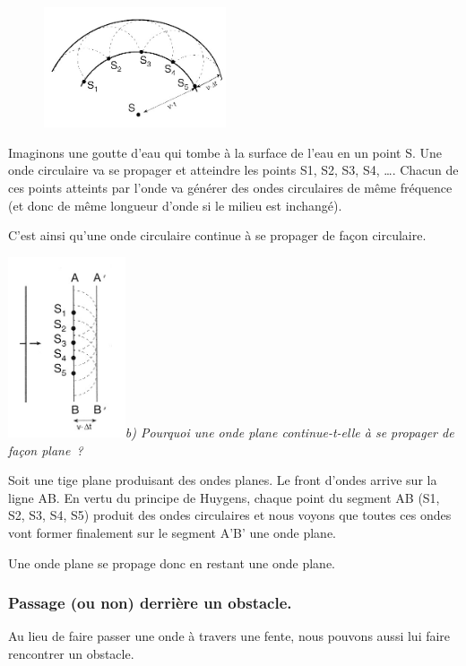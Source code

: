 \begin{figure}
\centering
\includegraphics[width=5.369cm,height=3.551cm]{Pictures/10000001000001E8000001439B3D312A195F0A9A.png}
\caption{}
\end{figure}

Imaginons une goutte d'eau qui tombe à la surface de l'eau en un point
S. Une onde circulaire va se propager et atteindre les points S1, S2,
S3, S4, \ldots. Chacun de ces points atteints par l'onde va générer des
ondes circulaires de même fréquence (et donc de même longueur d'onde si
le milieu est inchangé).

C'est ainsi qu'une onde circulaire continue à se propager de façon
circulaire.

\includegraphics[width=3.461cm,height=5.323cm]{Pictures/1000000100000118000001AF621E98E90630327B.png}\emph{b)
Pourquoi une onde plane continue-t-elle à se propager de façon plane~? }

Soit une tige plane produisant des ondes planes. Le front d'ondes arrive
sur la ligne AB. En vertu du principe de Huygens, chaque point du
segment AB (S1, S2, S3, S4, S5) produit des ondes circulaires et nous
voyons que toutes ces ondes vont former finalement sur le segment A'B'
une onde plane.

Une onde plane se propage donc en restant une onde plane.
\subsubsection{Passage (ou non) derrière un obstacle. }

Au lieu de faire passer une onde à travers une fente, nous pouvons aussi
lui faire rencontrer un obstacle.

